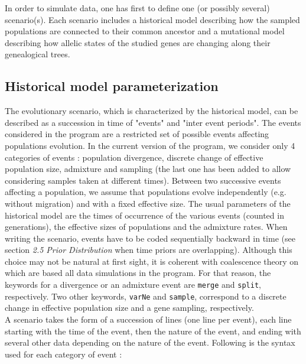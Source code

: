 In order to simulate data, one has first to define one (or possibly
several) scenario(s). Each scenario includes a historical model describing
how the sampled populations are connected to their common ancestor
and a mutational model describing how allelic states of the studied
genes are changing along their genealogical trees.\\



\subsection{Historical model parameterization}

The evolutionary scenario, which is characterized by the historical
model, can be described as a succession in time of "events"
and "inter event periods". The events
considered in the program are a restricted set of possible events
affecting populations evolution. In the current version of the program,
we consider only 4 categories of events : population divergence, discrete
change of effective population size, admixture and sampling (the last
one has been added to allow considering samples taken at different
times). Between two successive events affecting a population, we assume
that populations evolve independently (e.g. without migration) and
with a fixed effective size. The usual parameters of the historical
model are the times of occurrence of the various events (counted in
generations), the effective sizes of populations and the admixture
rates. When writing the scenario, events have to be coded sequentially
backward in time (see section \emph{2.5 Prior Distribution} when time
priors are overlapping). Although this choice may not be natural at
first sight, it is coherent with coalescence theory on which are based
all data simulations in the program. For that reason, the keywords
for a divergence or an admixture event are \texttt{merge} and \texttt{split},
respectively. Two other keywords, \texttt{varNe} and \texttt{sample},
correspond to a discrete change in effective population size and a
gene sampling, respectively. %
\\
 A scenario takes the form of a succession of lines (one line per
event), each line starting with the time of the event, then the nature
of the event, and ending with several other data depending on the
nature of the event. Following is the syntax used for each category
of event :
